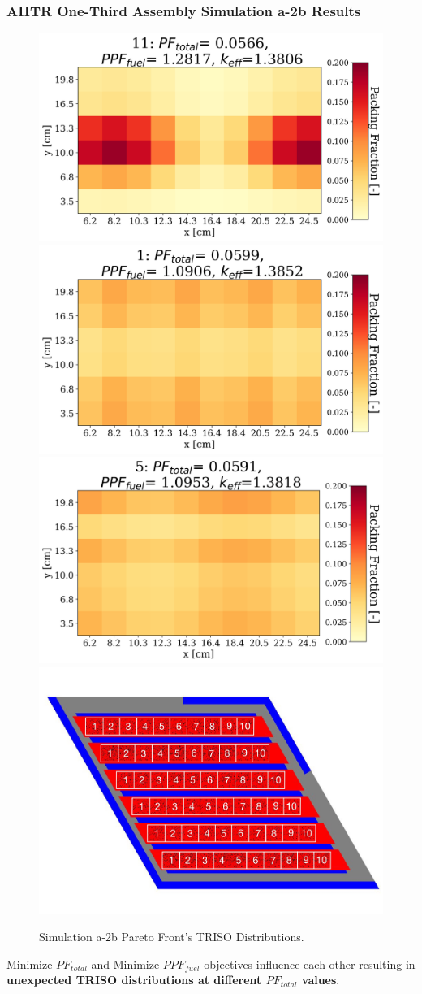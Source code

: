 \begin{frame}
    \frametitle{AHTR One-Third Assembly Simulation a-2b Results}
    \begin{figure}
        \centering
        \includegraphics[width=0.37\linewidth]{../docs/figures/a-2b-pf-most-minimized.png} 
        \includegraphics[width=0.37\linewidth]{../docs/figures/a-2b-ppf-most-minimized.png} 
        \includegraphics[width=0.37\linewidth]{../docs/figures/a-2b-both-most-minimized.png}
        \includegraphics[width=0.33\linewidth]{../docs/figures/ahtr_assembly.png} 
        \caption{Simulation a-2b Pareto Front's TRISO Distributions.}
    \end{figure}
    \vspace{-0.5cm}
    \begin{tcolorbox}[colback=illiniorange,colframe=illiniorange!50!black]
        Minimize $PF_{total}$ and Minimize $PPF_{fuel}$ objectives 
        influence each other resulting in \textbf{unexpected TRISO distributions at 
        different $PF_{total}$ values}. 
    \end{tcolorbox}
\end{frame}

